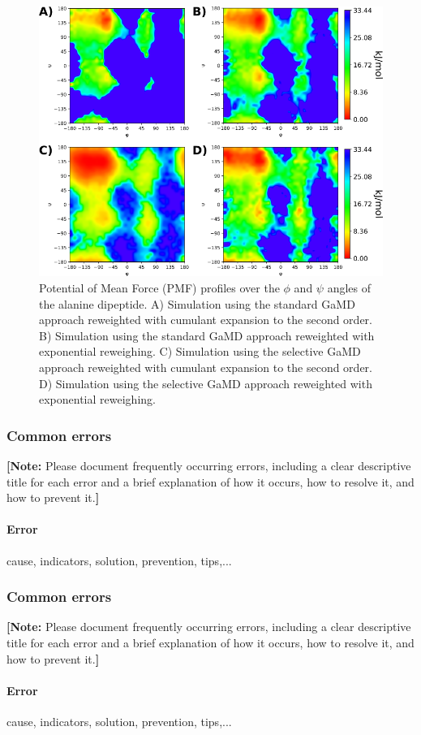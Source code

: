 \begin{figure}[H]
\centering
\includegraphics[scale=.43]{../07_tutorial_04/figures/pmf_tutorial}
\caption{Potential of Mean Force (PMF) profiles over the $\phi$ and $\psi$ angles of the alanine dipeptide. A) Simulation using the standard GaMD approach reweighted with cumulant expansion to the second order. B) Simulation using the standard GaMD approach reweighted with exponential reweighing. C) Simulation using the selective GaMD approach reweighted with cumulant expansion to the second order. D) Simulation using the selective GaMD approach reweighted with exponential reweighing. }
\label{aladip_pmf}
\end{figure}

\subsubsection{Common errors}
\textbf{[Note:} Please document frequently occurring errors, including a clear descriptive title for each error and a brief explanation of how it occurs, how to resolve it, and how to prevent it.\textbf{]}

\paragraph{Error}
cause, indicators, solution, prevention, tips,...

\subsubsection{Common errors}
\textbf{[Note:} Please document frequently occurring errors, including a clear descriptive title for each error and a brief explanation of how it occurs, how to resolve it, and how to prevent it.\textbf{]}

\paragraph{Error}
cause, indicators, solution, prevention, tips,...

